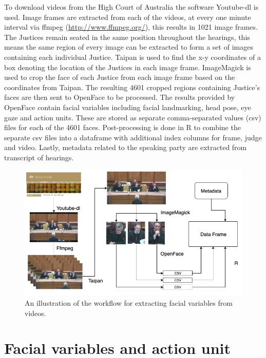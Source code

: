 \documentclass{monashthesis}
\begin{document}
To download videos from the High Court of Australia the software Youtube-dl \autocite{youtube-dl} is used. Image frames are extracted from each of the videos, at every one minute interval via ffmpeg (\url{http://www.ffmpeg.org/}), this results in 1021 image frames. The Justices remain seated in the same position throughout the hearings, this means the same region of every image can be extracted to form a set of images containing each individual Justice. Taipan \autocite{Taipan} is used to find the x-y coordinates of a box denoting the location of the Justices in each image frame. ImageMagick \autocite{ImageMagick} is used to crop the face of each Justice from each image frame based on the coordinates from Taipan. The resulting 4601 cropped regions containing Justice's faces are then sent to OpenFace \autocite{baltrusaitis2018openface} to be processed. The results provided by OpenFace contain facial variables including facial landmarking, head pose, eye gaze and action units. These are stored as separate comma-separated values (csv) files for each of the 4601 faces. Post-processing is done in R to combine the separate csv files into a dataframe with additional index columns for frame, judge and video. Lastly, metadata related to the speaking party are extracted from transcript of hearings.

\begin{figure}

{\centering \includegraphics[width=1\linewidth]{figures/workflow} 

}

\caption{An illustration of the workflow for extracting facial variables from videos. \label{fig:workflow}}\label{fig:unnamed-chunk-1}
\end{figure}

\hypertarget{facial-variables-and-action-unit}{%
\section{Facial variables and action unit}\label{facial-variables-and-action-unit}}
\end{document}
